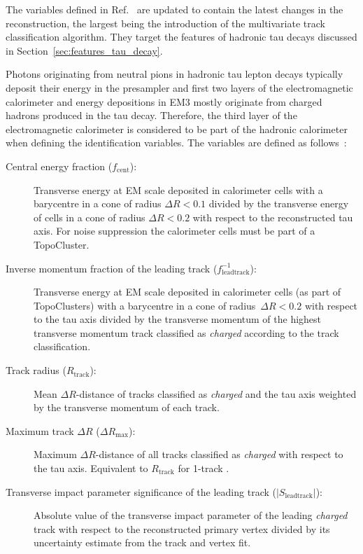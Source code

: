 The variables defined in Ref.~\cite{atlas:taurec:run2} are updated to contain
the latest changes in the reconstruction, the largest being the introduction of
the multivariate track classification algorithm. They target the features of
hadronic tau decays discussed in Section~\ref{sec:features_tau_decay}.

Photons originating from neutral pions in hadronic tau lepton decays typically
deposit their energy in the presampler and first two layers of the
electromagnetic calorimeter and energy depositions in EM3 mostly originate from
charged hadrons produced in the tau decay. Therefore, the third layer of the
electromagnetic calorimeter is considered to be part of the hadronic calorimeter
when defining the identification variables. The variables are defined as
follows~\cite{atlas:taurec:run2}:
\begin{description}
\item[Central energy fraction ($f_\text{cent}$):] Transverse energy at EM scale
  deposited in calorimeter cells with a barycentre in a cone of radius
  $\Delta R < 0.1$ divided by the transverse energy of cells in a cone of radius
  $\Delta R < 0.2$ with respect to the reconstructed tau axis.
  For noise suppression the calorimeter cells must be part of a TopoCluster.

\item[Inverse momentum fraction of the leading track
  ($f_\text{leadtrack}^{-1}$):] Transverse energy at EM scale deposited in
  calorimeter cells (as part of TopoClusters) with a barycentre in a cone of
  radius~$\Delta R < 0.2$ with respect to the tau axis divided by the transverse
  momentum of the highest transverse momentum track classified as \emph{charged}
  according to the track classification.

\item[Track radius ($R_\text{track}$):] Mean $\Delta R$-distance of tracks
  classified as \emph{charged} and the tau axis weighted by the transverse
  momentum of each track.

\item[Maximum track $\Delta R$ ($\Delta R_\text{max}$):] Maximum
  $\Delta R$-distance of all tracks classified as \emph{charged} with respect to
  the tau axis. Equivalent to $R_\text{track}$ for 1-track \tauhadvis.

\item[Transverse impact parameter significance of the leading track
  ($| S_\text{leadtrack} |$):] Absolute value of the transverse impact parameter
  of the leading \emph{charged} track with respect to the reconstructed primary
  vertex divided by its uncertainty estimate from the track and vertex fit.


\end{description}
